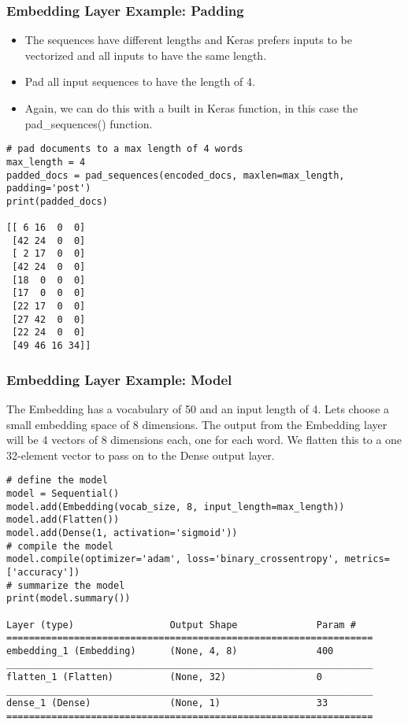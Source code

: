 \begin{frame}[fragile]\frametitle{Embedding Layer Example: Padding}

\begin{itemize}
\item The sequences have different lengths and Keras prefers inputs to be vectorized and all inputs to have the same length. 
\item Pad all input sequences to have the length of 4. 
\item Again, we can do this with a built in Keras function, in this case the pad\_sequences() function.
\end{itemize}

\begin{lstlisting}
# pad documents to a max length of 4 words
max_length = 4
padded_docs = pad_sequences(encoded_docs, maxlen=max_length, padding='post')
print(padded_docs)

[[ 6 16  0  0]
 [42 24  0  0]
 [ 2 17  0  0]
 [42 24  0  0]
 [18  0  0  0]
 [17  0  0  0]
 [22 17  0  0]
 [27 42  0  0]
 [22 24  0  0]
 [49 46 16 34]]
\end{lstlisting}
\end{frame}

\begin{frame}[fragile]\frametitle{Embedding Layer Example: Model}

The Embedding has a vocabulary of 50 and an input length of 4. Lets choose a small embedding space of 8 dimensions. The output from the Embedding layer will be 4 vectors of 8 dimensions each, one for each word. We flatten this to a one 32-element vector to pass on to the Dense output layer.

\begin{lstlisting}
# define the model
model = Sequential()
model.add(Embedding(vocab_size, 8, input_length=max_length))
model.add(Flatten())
model.add(Dense(1, activation='sigmoid'))
# compile the model
model.compile(optimizer='adam', loss='binary_crossentropy', metrics=['accuracy'])
# summarize the model
print(model.summary())

Layer (type)                 Output Shape              Param #
=================================================================
embedding_1 (Embedding)      (None, 4, 8)              400
_________________________________________________________________
flatten_1 (Flatten)          (None, 32)                0
_________________________________________________________________
dense_1 (Dense)              (None, 1)                 33
=================================================================
\end{lstlisting}
\end{frame} 

